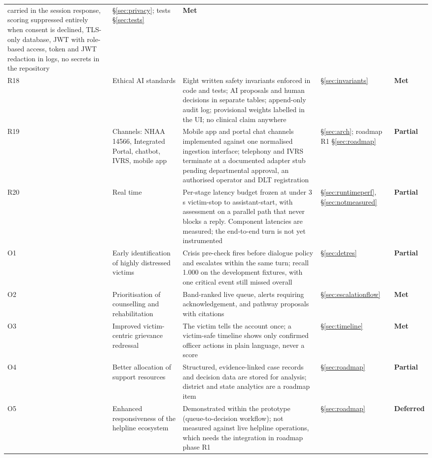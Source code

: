 \documentclass[11pt,a4paper]{article}
\newcommand{\yes}{\textcolor{sahaygreen}{\textbf{Met}}}
\newcommand{\partly}{\textcolor{sahayorange}{\textbf{Partial}}}
\newcommand{\defer}{\textcolor{sahaygray}{\textbf{Deferred}}}
\begin{document}
\begin{longtable}{@{}>{\raggedright\arraybackslash}p{0.7cm}>{\raggedright\arraybackslash}p{3.2cm}>{\raggedright\arraybackslash}p{5.5cm}>{\raggedright\arraybackslash}p{2.9cm}>{\raggedright\arraybackslash}p{1.75cm}@{}}
carried in the session response, scoring suppressed entirely when consent is declined, TLS-only
database, JWT with role-based access, token and JWT redaction in logs, no secrets in the repository
& \S\ref{sec:privacy}; tests \S\ref{sec:tests} & \yes \\
R18 & Ethical AI standards & Eight written safety invariants enforced in code and tests; AI
proposals and human decisions in separate tables; append-only audit log; provisional weights labelled
in the UI; no clinical claim anywhere & \S\ref{sec:invariants} & \yes \\
R19 & Channels: NHAA 14566, Integrated Portal, chatbot, IVRS, mobile app & Mobile app and portal chat
channels implemented against one normalised ingestion interface; telephony and IVRS terminate at a
documented adapter stub pending departmental approval, an authorised operator and DLT registration &
\S\ref{sec:arch}; roadmap R1 \S\ref{sec:roadmap} & \partly \\
R20 & Real time & Per-stage latency budget frozen at under 3\,s victim-stop to assistant-start, with
assessment on a parallel path that never blocks a reply. Component latencies are measured; the
end-to-end turn is not yet instrumented & \S\ref{sec:runtimeperf}, \S\ref{sec:notmeasured} &
\partly \\
O1 & Early identification of highly distressed victims & Crisis pre-check fires before dialogue
policy and escalates within the same turn; recall 1.000 on the development fixtures, with one
critical event still missed overall & \S\ref{sec:detres} & \partly \\
O2 & Prioritisation of counselling and rehabilitation & Band-ranked live queue, alerts requiring
acknowledgement, and pathway proposals with citations & \S\ref{sec:escalationflow} & \yes \\
O3 & Improved victim-centric grievance redressal & The victim tells the account once; a victim-safe
timeline shows only confirmed officer actions in plain language, never a score & \S\ref{sec:timeline}
& \yes \\
O4 & Better allocation of support resources & Structured, evidence-linked case records and decision
data are stored for analysis; district and state analytics are a roadmap item &
\S\ref{sec:roadmap} & \partly \\
O5 & Enhanced responsiveness of the helpline ecosystem & Demonstrated within the prototype
(queue-to-decision workflow); not measured against live helpline operations, which needs the
integration in roadmap phase R1 & \S\ref{sec:roadmap} & \defer \\
\end{longtable}
\end{document}
